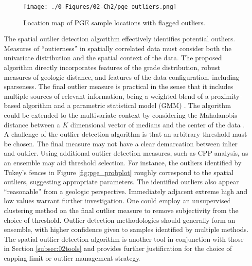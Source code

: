 \begin{figure}[htb!]
    \centering
    \texttt{[image: ./0-Figures/02-Ch2/pge\_outliers.png]}
    \caption{Location map of \gls{PGE} sample locations with flagged outliers.}
    \label{fig:pge_outliers}
\end{figure}

The spatial outlier detection algorithm effectively identifies potential outliers. Measures of ``outierness'' in spatially correlated data must consider both the univariate distribution and the spatial context of the data. The proposed algorithm directly incorporates features of the grade distribution, robust measures of geologic distance, and features of the data configuration, including sparseness. The final outlier measure is practical in the sense that it includes multiple sources of relevant information, being a weighted blend of a proximity-based algorithm and a parametric statistical model (\gls{GMM}) \citep{li2022ecod}. The algorithm could be extended to the multivariate context by considering the Mahalanobis distance between a $K$ dimensional vector of medians and the center of the data \citep{chen2008detecting}. A challenge of the outlier detection algorithm is that an arbitrary threshold must be chosen. The final measure may not have a clear demarcation between inlier and outlier. Using additional outlier detection measures, such as \gls{CPP} analysis, as an ensemble may aid threshold selection. For instance, the outliers identified by Tukey's fences in Figure \ref{fig:pge_probplot} roughly correspond to the spatial outliers, suggesting appropriate parameters. The identified outliers also appear ``reasonable'' from a geologic perspective. Immediately adjacent extreme high and low values warrant further investigation. One could employ an unsupervised clustering method on the final outlier measure to remove subjectivity from the choice of threshold. Outlier detection methodologies should generally form an ensemble, with higher confidence given to samples identified by multiple methods. The spatial outlier detection algorithm is another tool in conjunction with those in Section \ref{subsec:02tools} and provides further justification for the choice of capping limit or outlier management strategy.


